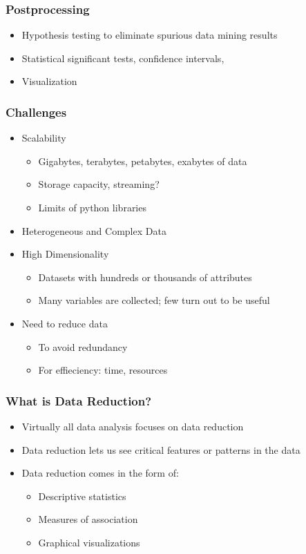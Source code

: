 \begin{frame}[fragile]\frametitle{Postprocessing}
\begin{itemize}
\item Hypothesis testing to eliminate spurious data mining results
\item Statistical significant tests, confidence intervals, 
\item Visualization
\end{itemize}
\end{frame}


\begin{frame}[fragile]\frametitle{Challenges}
\begin{itemize}
\item Scalability
	\begin{itemize}
	\item Gigabytes, terabytes, petabytes, exabytes of data
	\item Storage capacity, streaming?
	\item Limits of python libraries
	\end{itemize}
\item Heterogeneous and Complex Data
\item High Dimensionality
	\begin{itemize}
	\item Datasets with hundreds or thousands of attributes
	\item Many variables are collected; few turn out to be useful
	\end{itemize}
\item Need to reduce data
	\begin{itemize}
	\item To avoid redundancy
	\item For effieciency: time, resources
	\end{itemize}
\end{itemize}
\end{frame}

\begin{frame}[fragile]\frametitle{What is Data Reduction?}
\begin{itemize}
\item Virtually all data analysis focuses on data reduction
\item Data reduction lets us see critical features or patterns in the data
\item Data reduction comes in the form of:
\begin{itemize}
\item Descriptive statistics
\item Measures of association
\item Graphical visualizations
\end{itemize}
\end{itemize}
\end{frame}


